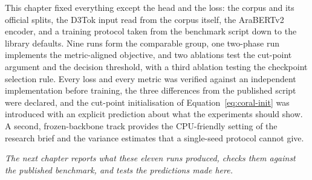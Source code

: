 This chapter fixed everything except the head and the loss: the corpus and its official splits,
the D3Tok input read from the corpus itself, the AraBERTv2 encoder, and a training protocol
taken from the benchmark script down to the library defaults. Nine runs form the comparable
group, one two-phase run implements the metric-aligned objective, and two ablations test the
cut-point argument and the decision threshold, with a third ablation testing the checkpoint
selection rule. Every loss and every metric was verified against an independent implementation
before training, the three differences from the published script were declared, and the
cut-point initialisation of Equation~\ref{eq:coral-init} was introduced with an explicit
prediction about what the experiments should show. A second, frozen-backbone track provides
the CPU-friendly setting of the research brief and the variance estimates that a single-seed
protocol cannot give.

\textit{The next chapter reports what these eleven runs produced, checks them against the
published benchmark, and tests the predictions made here.}
